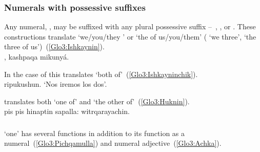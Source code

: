 {\subsubsection{Numerals with possessive suffixes}\label{ssec:numallaff}
Any numeral, , may be suffixed with any plural possessive suffix --~, , or . These constructions translate ‘we/you/they ’ or ‘the  of us/you/them’ ( ‘we three’, ‘the three of us’)~(\ref{Glo3:Ishkaynin}).\\

%
{,  kashpaqa mikunyá.}%
{}%
{}{}%

\noindent
In the case of  this translates ‘both of’~(\ref{Glo3:Ishkayninchik}).\\

%
{ ripukushun.}%
{}%
{‘Nos iremos los dos’.}%
{}{}%

\noindent
{} translates both ‘one of’ and ‘the other of’~(\ref{Glo3:Huknin}).\\

%
{pis pis hinaptin sapalla: witrqarayachin.}%
{}%
{}{}%

\subsubsection{}\label{ssec:huk}
 ‘one’ has several functions in addition to its function as a numeral~(\ref{Glo3:Pichqamulla}) and numeral adjective~(\ref{Glo3:Achka}).\\

}
